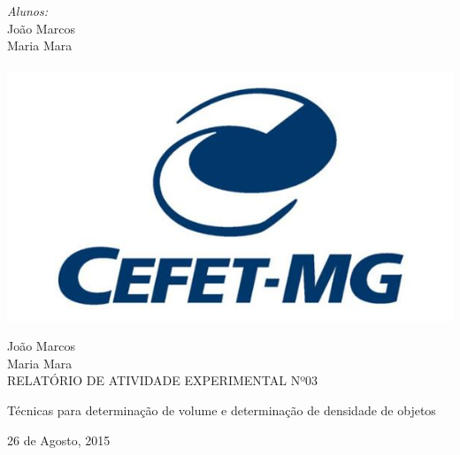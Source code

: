 \documentclass[12pt]{article}
\begin{document}
\begin{titlepage}
\flushleft \Large \emph{Alunos:}\\ 
João Marcos\\ 
Maria Mara \\ %


\\[2cm] %


\includegraphics[scale = 0.3]{logo.jpg}\\[1cm] %
 

\begin{titlepage}
\vfill
\begin{center} 
{\large João Marcos \\  [0.1cm]
Maria Mara } \\[5cm] 
{\Huge RELATÓRIO DE ATIVIDADE EXPERIMENTAL Nº03}\\[1cm]
\hspace{.45\textwidth} %
\begin{minipage}{.5\textwidth}
Técnicas para determinação de volume e determinação de densidade de objetos
\end{minipage}
\vfill
26 de Agosto, 2015
\end{center}
\end{titlepage}

\vfill %

\end{titlepage}
\end{document}
